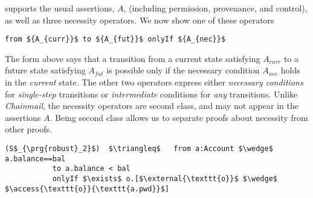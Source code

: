 \Nec supports the usual assertions, $A$, (including permission, provenance,
and control), as well as three necessity 
{operators. We now show one of these operators} 
\begin{lstlisting}[mathescape=true, language=chainmail, frame=lines]
                                from ${A_{curr}}$ to ${A_{fut}}$ onlyIf ${A_{nec}}$ 
\end{lstlisting}
The  form   {above} says that %
a  {transition} from a current state satisfying $A_{curr}$ to a future
state satisfying $A_{fut}$ %
is possible only if the necessary condition
$A_{nec}$ holds in the \emph{current} state.
 {The other two operators express either \emph{necessary conditions} for
\emph{single-step} transitions %
or \emph{intermediate} conditions for \emph{any} transitions.
}
Unlike  \emph{Chainmail}, 
 the necessity operators %
 are second class, and may not appear in the assertions $A$.
Being second class allows us to separate proofs about necessity from other proofs.
\begin{lstlisting}[language = Chainmail, mathescape=true, frame=lines]
(S$_{\prg{robust}_2}$)  $\triangleq$   from a:Account $\wedge$ a.balance==bal
           to a.balance < bal
           onlyIf $\exists$ o.[$\external{\texttt{o}}$ $\wedge$ $\access{\texttt{o}}{\texttt{a.pwd}}$]
\end{lstlisting}


